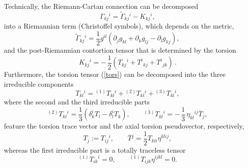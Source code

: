 \documentclass[12pt,prd,showkeys,amsmath,amssymb,nofootinbib]{revtex4-1}
\begin{document}
Technically, the Riemann-Cartan connection can be decomposed
\begin{equation}
\Gamma_{kj}{}^i = \widetilde{\Gamma}_{kj}{}^i - K_{kj}{}^i,\label{dist}
\end{equation}
into a Riemannian term (Christoffel symbols), which depends on the metric, 
\begin{equation}\label{Chr}
\widetilde{\Gamma}_{kj}{}^i = {\frac 12}g^{il}(\partial_jg_{kl} + \partial_kg_{lj} - \partial_lg_{kj}),
\end{equation}
and the post-Riemannian contortion tensor that is determined by the torsion 
\begin{equation}\label{NTQ}
K_{kj}{}^i = -\,{\frac 12}(T_{kj}{}^i + T^i{}_{kj} + T^i{}_{jk})\,.
\end{equation}
Furthermore, the torsion tensor (\ref{tors}) can be decomposed \cite{SHAPIRO2002113} into the three irreducible components
\begin{equation}
T_{kl}{}^{i} = {}^{(1)}T_{kl}{}^{i} + {}^{(2)}T_{kl}{}^{i} + {}^{(3)}T_{kl}{}^{i},
\end{equation}
where the second and the third irreducible parts 
\begin{equation}\label{tT2}
{}^{(2)}T_{kl}{}^{i} = {\frac 13}\!\left(\delta^i_{k}T_{l} - \delta^i_{l}T_{k}\right),\qquad
{}^{(3)}T_{kl}{}^{i} = -\,{\frac 13}\,\eta_{kl}{}^{ij}\overline{T}{}_j, %
\end{equation}
feature the torsion trace vector and the axial torsion pseudovector, respectively,
\begin{equation}
T_j := T_{ij}{}^i,\qquad \overline{T}{}^j = {\frac 12}T_{kli}\eta^{klij},\label{Pv}
\end{equation}
whereas the first irreducible part is a totally traceless tensor
\begin{equation}
{}^{(1)}T_{ik}{}^{i} = 0,\qquad {}^{(1)}T_{ijk}\eta^{ijkl} = 0.\label{tT1}
\end{equation}
\end{document}
